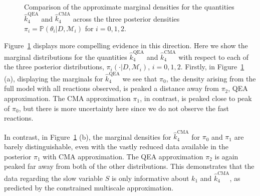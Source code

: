 \documentclass[final]{siamltex}
\begin{document}
\begin{figure}[!htb]
\centering
{}
\caption{Comparison of the approximate marginal densities for the
  quantities $\hat{k}_4^{\text{QEA}}$ and $\hat{k}_4^{\text{CMA}}$
  across the three posterior densities $\pi_i = \mathbb{P}(\theta_i|D,\mathcal{M}_i)$ for $i = 0, 1, 2$.}
\label{fig:chem_model_comp}
\end{figure}

Figure~\ref{fig:chem_model_comp} displays more compelling evidence in
this direction. Here we show the marginal distributions for the
quantities $\hat{k}_4^{\text{QEA}}$ and $\hat{k}_4^{\text{CMA}}$ with
respect to each of the three posterior distributions, $\pi_i(\cdot|D,
\mathcal{M}_i)$, $i = 0, 1, 2$. Firstly, in
Figure~\ref{fig:chem_model_comp} (a), displaying the marginals for
$\hat{k}_4^{\text{QEA}}$ we see that $\pi_0$, the density arising from
the full model with all reactions observed, is peaked a distance away
from $\pi_2$, QEA approximation. The CMA approximation $\pi_1$, in contrast, is
peaked close to peak of $\pi_0$, but there is more uncertainty here
since we do not observe the fast reactions.

In contrast, in Figure~\ref{fig:chem_model_comp} (b), the marginal
densities for $\hat{k}_4^{\text{CMA}}$ for $\pi_0$ and $\pi_1$ are
barely distinguishable, even with the vastly reduced data available in
the posterior $\pi_1$ with CMA approximation. The QEA approximation
$\pi_2$ is again peaked far away from both of the other distributions.
This demonstrates that the data regarding the slow variable
$S$ is only informative about $k_1 $ and $\hat{k}_4^{\text{CMA}}$, as
predicted by the constrained multiscale approximation.
\end{document}
